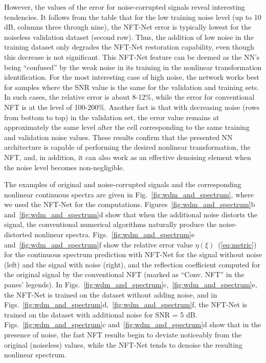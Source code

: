 However, the values of the error for noise-corrupted signals reveal interesting tendencies. 
It follows from the table that for the low training noise level (up to 10 dB, columns three through nine), the NFT-Net error is typically lowest for the noiseless validation dataset (second row).
Thus, the addition of low noise in the training dataset only degrades the NFT-Net restoration capability, even though this decrease is not significant. This NFT-Net feature can be deemed as the NN's being ``confused'' by the weak noise in its training in the nonlinear transformation identification. 
For the most interesting case of high noise, the network works best for samples where the SNR value is the same for the validation and training sets. 
In such cases, the relative error is about 8-12\%, while the error for conventional NFT is at the level of 100-200\%.
Another fact is that with decreasing noise (rows from bottom to top) in the validation set, the error value remains at approximately the same level after the cell corresponding to the same training and validation noise values. 
These results confirm that the presented NN architecture is capable of performing the desired nonlinear transformation, the NFT, and, in addition, it can also work as an effective denoising element when the noise level becomes non-negligible. 



The examples of original and noise-corrupted signals and the corresponding nonlinear continuous spectra are given in Fig.~\ref{fig:wdm_and_spectrum}, where we used the NFT-Net for the computations. Figures~\ref{fig:wdm_and_spectrum}b and~\ref{fig:wdm_and_spectrum}d show that when the additional noise distorts the signal, the conventional numerical algorithms naturally produce the noise-distorted nonlinear spectra.
Figs.~\ref{fig:wdm_and_spectrum}e and~\ref{fig:wdm_and_spectrum}f show the relative error value $\eta(\xi)$~(\ref{eq:metric}) for the continuous spectrum prediction with NFT-Net for the signal without noise (left) and the signal with noise (right), and the reflection coefficient computed for the original signal by the conventional NFT (marked as ``Conv. NFT'' in the panes' legends). In Figs.~\ref{fig:wdm_and_spectrum}c,~\ref{fig:wdm_and_spectrum}e, the NFT-Net is trained on the dataset without adding noise, and in Figs.~\ref{fig:wdm_and_spectrum}d,~\ref{fig:wdm_and_spectrum}f, the NFT-Net is trained on the dataset with additional noise for SNR = 5 dB. Figs.~\ref{fig:wdm_and_spectrum}c and~\ref{fig:wdm_and_spectrum}d show that in the presence of noise, the fast NFT results begin to deviate noticeably from the original (noiseless) values, while the NFT-Net tends to denoise the resulting nonlinear spectrum.








